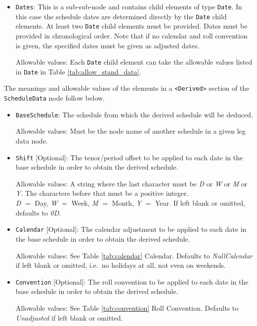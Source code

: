 \begin{itemize}
\item \lstinline!Dates!: This is a sub-sub-node and contains child elements of type
  \lstinline!Date!. In this case the schedule dates are determined
  directly by the \lstinline!Date! child elements.  At least two
  \lstinline!Date! child elements must be provided. Dates must be provided in chronological order. Note that if no calendar and roll convention is given, the specified dates must be given as adjusted dates.    

  Allowable values: Each \lstinline!Date!  child element can take the allowable values listed in \lstinline!Date! in
  Table \ref{tab:allow_stand_data}.

\end{itemize}

\medskip
The meanings and allowable values of the elements in a {\tt <Derived>} section of the \lstinline!ScheduleData! node follow below.

\begin{itemize}

\item \lstinline!BaseSchedule!: The schedule from which the derived schedule will be deduced.

Allowable values: Must be the node name of another schedule in a given leg data node.

\item \lstinline!Shift! [Optional]: The tenor/period offset to be applied to each date in the base schedule in order to obtain the derived schedule.

Allowable values: A string where the last character must be \emph{D} or \emph{W} or
\emph{M} or \emph{Y}.  The characters before that must be a positive integer. \\ \emph{D}
$=$ Day, \emph{W} $=$ Week, \emph{M} $=$ Month, \emph{Y} $=$ Year. If left blank or omitted, defaults to \emph{0D}.

\item \lstinline!Calendar! [Optional]: The calendar adjustment to be applied to each date in the base schedule in order to obtain the derived schedule.

Allowable values: See Table \ref{tab:calendar} Calendar. Defaults to \emph{NullCalendar} if left blank or omitted, i.e.\ no holidays at all, not even on weekends.

\item \lstinline!Convention! [Optional]: The roll convention to be applied to each date in the base schedule in order to obtain the derived schedule.

Allowable values: See Table \ref{tab:convention} Roll Convention. Defaults to \emph{Unadjusted} if left blank or omitted.

\end{itemize}